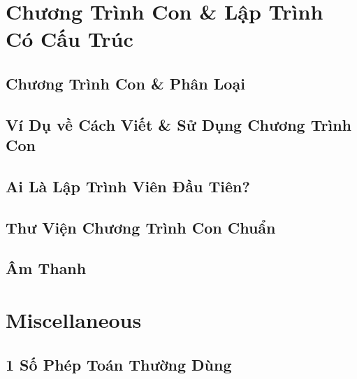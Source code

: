 \documentclass[oneside]{book}
\numberwithin{equation}{section}
\begin{document}

\chapter{Chương Trình Con \& Lập Trình Có Cấu Trúc}

\section{Chương Trình Con \& Phân Loại}


\section{Ví Dụ về Cách Viết \& Sử Dụng Chương Trình Con}


\section{Ai Là Lập Trình Viên Đầu Tiên?}


\section{Thư Viện Chương Trình Con Chuẩn}


\section{Âm Thanh}


\appendix

\chapter{Miscellaneous}

\section{1 Số Phép Toán Thường Dùng}
\end{document}
